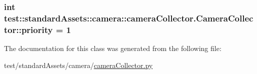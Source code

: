 \hypertarget{classtest_1_1standardAssets_1_1camera_1_1cameraCollector_1_1CameraCollector_a40ea70c11f7648b3c43b97cb6e2f03c5}{
\subsubsection[{priority}]{\setlength{\rightskip}{0pt plus 5cm}int {\bf test\-::standard\-Assets\-::camera\-::camera\-Collector.\-Camera\-Collector\-::priority} = 1}}\label{dc/dd5/classtest_1_1standardAssets_1_1camera_1_1cameraCollector_1_1CameraCollector_a40ea70c11f7648b3c43b97cb6e2f03c5}


\-The documentation for this class was generated from the following file\-:\begin{DoxyCompactItemize}
\item 
test/standard\-Assets/camera/\hyperlink{standardAssets_2camera_2cameraCollector_8py}{camera\-Collector.\-py}\end{DoxyCompactItemize}
